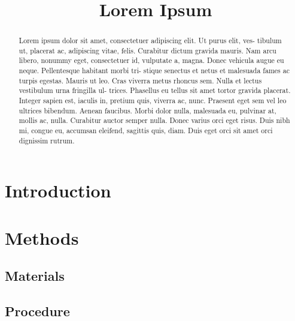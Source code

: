 \documentclass[a4paper,12pt]{hlsart}
\title{Lorem Ipsum}
\begin{document}
\maketitle
\begin{abstract}

Lorem ipsum dolor sit amet, consectetuer adipiscing elit. Ut purus elit, ves-
tibulum ut, placerat ac, adipiscing vitae, felis. Curabitur dictum gravida
mauris. Nam arcu libero, nonummy eget, consectetuer id, vulputate a, magna.
Donec vehicula augue eu neque. Pellentesque habitant morbi tri- stique senectus
et netus et malesuada fames ac turpis egestas. Mauris ut leo. Cras viverra
metus rhoncus sem. Nulla et lectus vestibulum urna fringilla ul- trices.
Phasellus eu tellus sit amet tortor gravida placerat. Integer sapien est,
iaculis in, pretium quis, viverra ac, nunc. Praesent eget sem vel leo ultrices
bibendum. Aenean faucibus. Morbi dolor nulla, malesuada eu, pulvinar at, mollis
ac, nulla. Curabitur auctor semper nulla. Donec varius orci eget risus. Duis
nibh mi, congue eu, accumsan eleifend, sagittis quis, diam. Duis eget orci sit
amet orci dignissim rutrum.

\end{abstract}

\section{Introduction}
\lipsum[2]

\section{Methods}
\subsection{Materials}
\lipsum[3]

\subsection{Procedure}
\lipsum[4]
\end{document}

